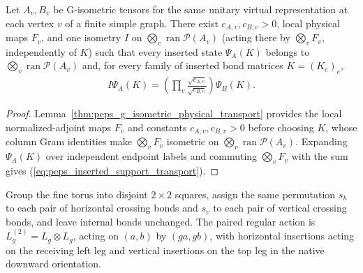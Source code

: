 
\begin{lemma}%
    \label{thm:peps_inserted_physical_support_transport}
    \leanok
    Let $A_v,B_v$ be G-isometric tensors for the same unitary virtual
    representation at each vertex $v$ of a finite simple graph. There exist
    $c_{A,v},c_{B,v}>0$, local physical maps $F_v$, and one isometry $I$ on
    $\bigotimes_v\operatorname{ran}\mathcal P(A_v)$ (acting there by
    $\bigotimes_v F_v$, independently of $K$) such that every inserted state
    $\Psi_A(K)$ belongs to $\bigotimes_v\operatorname{ran}\mathcal P(A_v)$ and,
    for every family of inserted bond matrices $K=(K_e)_e$,
    \begin{align}
        I\Psi_A(K)=\left(\prod_v\frac{\sqrt{c_{A,v}}}{\sqrt{c_{B,v}}}\right)
        \Psi_B(K).
        \label{eq:peps_inserted_support_transport}
    \end{align}
\end{lemma}
\begin{proof}\leanok
    Lemma~\ref{thm:peps_g_isometric_physical_transport} provides the local
    normalized-adjoint maps $F_v$ and constants $c_{A,v},c_{B,v}>0$ before
    choosing $K$, whose column Gram identities make $\bigotimes_v F_v$
    isometric on $\bigotimes_v\operatorname{ran}\mathcal P(A_v)$. Expanding
    $\Psi_A(K)$ over independent endpoint labels and commuting $\bigotimes_v F_v$
    with the sum gives (\ref{eq:peps_inserted_support_transport}).
\end{proof}

\begin{definition}%
    \label{def:peps_twisted_two_by_two_coordinates}
    \leanok
    Group the fine torus into disjoint $2\times2$ squares, assign the same
    permutation $s_h$ to each pair of horizontal crossing bonds and $s_v$ to
    each pair of vertical crossing bonds, and leave internal bonds unchanged.
    The paired regular action is $L_g^{(2)}=L_g\otimes L_g$, acting on $(a,b)$
    by $(ga,gb)$, with horizontal insertions acting on the receiving left leg
    and vertical insertions on the top leg in the native downward orientation.
\end{definition}

